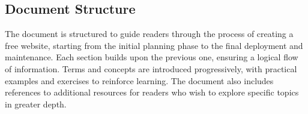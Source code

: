 \subsection{Document Structure}

The document is structured to guide readers through the process of creating a free website, starting from the initial planning phase to the final deployment and maintenance. Each section builds upon the previous one, ensuring a logical flow of information. Terms and concepts are introduced progressively, with practical examples and exercises to reinforce learning. The document also includes references to additional resources for readers who wish to explore specific topics in greater depth.
